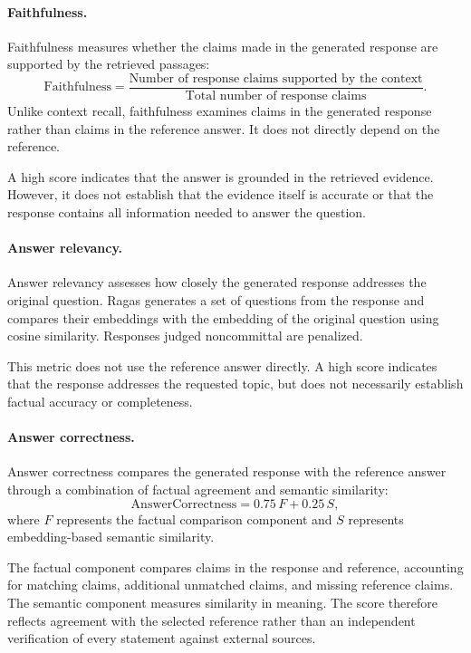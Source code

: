 \documentclass[a4paper,12pt]{report}
\begin{document}
\paragraph{Faithfulness.}
Faithfulness measures whether the claims made in the generated
response are supported by the retrieved passages:
\[
\mathrm{Faithfulness}
=
\frac{\text{Number of response claims supported by the context}}
     {\text{Total number of response claims}}.
\]
Unlike context recall, faithfulness examines claims in the generated
response rather than claims in the reference answer. It does not
directly depend on the reference.

A high score indicates that the answer is grounded in the retrieved
evidence. However, it does not establish that the evidence itself
is accurate or that the response contains all information needed
to answer the question.

\paragraph{Answer relevancy.}
Answer relevancy assesses how closely the generated response
addresses the original question. Ragas generates a set of questions
from the response and compares their embeddings with the embedding
of the original question using cosine similarity. Responses judged
noncommittal are penalized.

This metric does not use the reference answer directly. A high
score indicates that the response addresses the requested topic,
but does not necessarily establish factual accuracy or completeness.

\paragraph{Answer correctness.}
Answer correctness compares the generated response with the
reference answer through a combination of factual agreement and
semantic similarity:
\[
\mathrm{AnswerCorrectness}
=
0.75\,F + 0.25\,S,
\]
where $F$ represents the factual comparison component and $S$
represents embedding-based semantic similarity.

The factual component compares claims in the response and reference,
accounting for matching claims, additional unmatched claims, and
missing reference claims. The semantic component measures similarity
in meaning. The score therefore reflects agreement with the selected
reference rather than an independent verification of every statement
against external sources.
\end{document}

